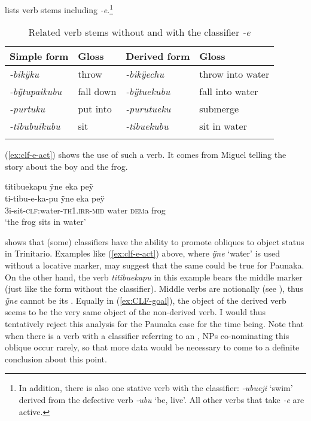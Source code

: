  lists verb stems including \textit{-e}.\footnote{In addition, there is also one stative verb with the classifier: \textit{-ubueji} ‘swim’ derived from the defective verb \textit{-ubu} ‘be, live’. All other verbs that take \textit{-e} are active.}


\begin{table}
\caption{Related verb stems without and with the classifier \textit{-e}}

\begin{tabular}{llll}
\lsptoprule
Simple form & Gloss & Derived form & Gloss \\
\midrule
\textit{-bikÿku} & throw & \textit{-bikÿechu} & throw into water\\
\textit{-bÿtupaikubu} & fall down & \textit{-bÿtuekubu} & fall into water\\
\textit{-purtuku} & put into & \textit{-purutueku} & submerge\\
\textit{-tibubuikubu} & sit & \textit{-tibuekubu} & sit in water\\
\lspbottomrule
\end{tabular}

\label{table:DIR-e-deriv}
\end{table}

(\ref{ex:clf-e-act}) shows the use of such a verb. It comes from Miguel telling the story about the boy and the frog.

\ea\label{ex:clf-e-act}
\begingl
\glpreamble  titibuekapu ÿne eka peÿ\\
\gla  ti-tibu-e-ka-pu ÿne eka peÿ\\
\glb 3i-sit-\textsc{clf:}water-\textsc{th}1.\textsc{irr}-\textsc{mid} water \textsc{dem}a frog\\
\glft ‘the frog sits in water’
\endgl
\trailingcitation{[mox-a110920l-2.014]}
\xe

\citet[]{Rose2019b} shows that (some) classifiers have the ability to promote obliques to object status in Trinitario. Examples like (\ref{ex:clf-e-act}) above, where \textit{ÿne} ‘water’ is used without a locative marker, may suggest that the same could be true for Paunaka. On the other hand, the verb \textit{titibuekapu} in this example bears the middle marker (just like the form without the classifier). Middle verbs are notionally  (see ), thus \textit{ÿne} cannot be its . Equally in (\ref{ex:CLF-goal}), the object of the derived verb seems to be the very same object of the non-derived verb. I would thus tentatively reject this analysis for the Paunaka case for the time being. Note that when there is a verb with a classifier referring to an , NPs co-nominating this oblique occur rarely, so that more data would be necessary to come to a definite conclusion about this point.


